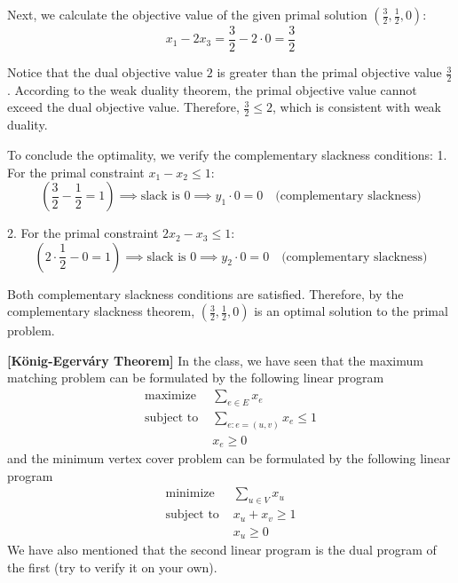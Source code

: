 \documentclass{oxmathproblems}
\begin{document}
\begin{questions}
Next, we calculate the objective value of the given primal solution \(\left(\frac{3}{2}, \frac{1}{2}, 0\right)\):
\[
x_1 - 2x_3 = \frac{3}{2} - 2 \cdot 0 = \frac{3}{2}
\]

Notice that the dual objective value \(2\) is greater than the primal objective value \(\frac{3}{2}\). According to the weak duality theorem, the primal objective value cannot exceed the dual objective value. Therefore, \(\frac{3}{2} \leq 2\), which is consistent with weak duality.

To conclude the optimality, we verify the complementary slackness conditions:
1. For the primal constraint \(x_1 - x_2 \leq 1\):
   \[
   \left(\frac{3}{2} - \frac{1}{2} = 1\right) \implies \text{slack is } 0 \implies y_1 \cdot 0 = 0 \quad \text{(complementary slackness)}
   \]

2. For the primal constraint \(2x_2 - x_3 \leq 1\):
   \[
   \left(2 \cdot \frac{1}{2} - 0 = 1\right) \implies \text{slack is } 0 \implies y_2 \cdot 0 = 0 \quad \text{(complementary slackness)}
   \]

Both complementary slackness conditions are satisfied. Therefore, by the complementary slackness theorem, \(\left(\frac{3}{2}, \frac{1}{2}, 0\right)\) is an optimal solution to the primal problem.

\miquestion[25]\textbf{[K\"{o}nig-Egerv\'{a}ry Theorem]}
In the class, we have seen that the maximum matching problem can be formulated by the following linear program
\begin{align*}
\text{maximize }& \sum_{e\in E}x_e \\
\text{subject to }&\sum_{e:e=(u,v)}x_e\leq 1  \tag{$\forall v\in V$}\\
&x_e\geq0\tag{$\forall e\in E$}
\end{align*}
and the minimum vertex cover problem can be formulated by the following linear program
\begin{align*}
\text{minimize }& \sum_{u\in V}x_u \\
\text{subject to }&x_u+x_v\geq 1  \tag{$\forall (u,v)\in E$}\\
&x_u\geq0\tag{$\forall u\in V$}
\end{align*}
\newpage
We have also mentioned that the second linear program is the dual program of the first (try to verify it on your own).
\end{questions}
\end{document}
